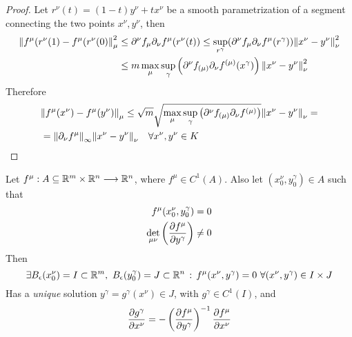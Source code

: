 \documentclass[../complete.tex]{subfiles}
\begin{document}
\begin{proof}
	Let $r^\nu(t)=(1-t)y^\nu+tx^\nu$ be a smooth parametrization of a segment connecting the two points $x^\nu,y^\nu$, then
	\begin{equation*}
		\begin{aligned}
			\norm{f^\mu(r^\nu(1)-f^\mu(r^\nu(0)}^2_\mu&\le\partial^\nu f_\mu\partial_\nu f^\mu(r^\nu(t))\le\sup_{r^\gamma}(\partial^\nu f_\mu\partial_\nu f^\mu(r^\gamma))\norm{x^\nu-y^\nu}_\nu^2\\
			&\le m\max_\mu\sup_\gamma\left(\partial^\nu f_{(\mu)}\partial_\nu f^{(\mu)}(x^\gamma)\right)\norm{x^\nu-y^\nu}_\nu^2
		\end{aligned}
	\end{equation*}
	Therefore
	\begin{equation*}
		\begin{aligned}
			&\norm{f^\mu(x^\nu)-f^\mu(y^\nu)}_\mu\le\sqrt{m}\sqrt{\max_\mu\sup_\gamma\left(\partial^\nu f_{(\mu)}\partial_\nu f^{(\mu)}\right)}\norm{x^\nu-y^\nu}_\nu=\\
			&=\norm{\partial_\nu f^\mu}_\infty\norm{x^\nu-y^\nu}_\nu\quad\forall x^\nu,y^\nu\in K
		\end{aligned}
	\end{equation*}
\end{proof}
\begin{thm}
	Let $f^\mu:A\subseteq\mathbb{R}^m\times\mathbb{R}^n\overset{}{\longrightarrow}\mathbb{R}^n$, where $f^\mu\in C^1(A)$. Also let $(x^\nu_0,y^\gamma_0)\in A$ such that
	\begin{equation*}
		\begin{aligned}
			f^\mu(x^\nu_0,y^\gamma_0)&=0\\
			\det_{\mu\nu}\left(\pdv{f^\mu}{y^\gamma}\right)&\ne0
		\end{aligned}
	\end{equation*}
	Then
	\begin{equation*}
		\exists B_\epsilon(x^\nu_0)=I\subset\R^m,\ B_\epsilon(y^\gamma_0)=J\subset\R^n\st f^\mu(x^\nu,y^\gamma)=0\ \forall(x^\nu,y^\gamma)\in I\times J
	\end{equation*}
	Has a \emph{unique} solution $y^\gamma=g^\gamma(x^\nu)\in J$, with $g^\gamma\in C^1(I)$, and
	\begin{equation}
		\pdv{g^\gamma}{x^\nu}=-\left( \pdv{f^\mu}{y^\gamma} \right)^{-1}\pdv{f^\mu}{x^\nu}
		\label{eq:dinider}
	\end{equation}
\end{thm}
\end{document}
